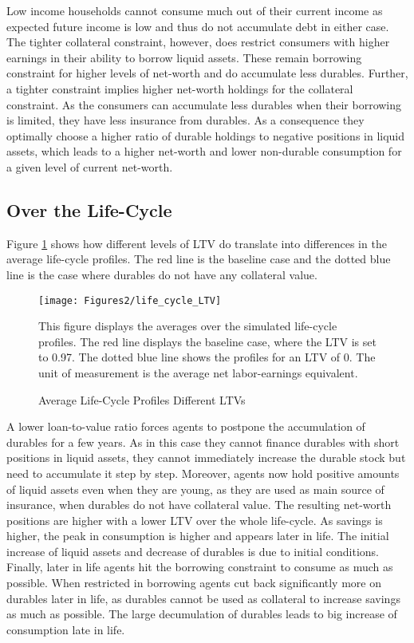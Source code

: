 \documentclass[a4paper,12pt,legno]{article}
\begin{document}
Low income households cannot consume much out of their current income as expected future income is low and thus do not accumulate debt in either case. The tighter collateral constraint, however, does restrict consumers with higher earnings in their ability to borrow liquid assets. These remain borrowing constraint for higher levels of net-worth and do accumulate less durables. Further, a tighter constraint implies higher net-worth holdings for the collateral constraint. As the consumers can accumulate less durables when their borrowing is limited, they have less insurance from durables. As a consequence they optimally choose a higher ratio of durable holdings to negative positions in liquid assets, which leads to a higher net-worth and lower non-durable consumption for a given level of current net-worth.

\subsection{Over the Life-Cycle}
Figure \ref{downpayment_vs_baseline_lc} shows how different levels of LTV do translate into differences in the average life-cycle profiles. The red line is the baseline case and the dotted blue line is the case where durables do not have any collateral value. \begin{figure}[!htbp]
\caption{Average Life-Cycle Profiles Different LTVs} 
\label{downpayment_vs_baseline_lc}	%
\centering
\texttt{[image: Figures2/life\_cycle\_LTV]}  %

\begin{minipage}{0.8\linewidth}
\footnotesize{This figure displays the averages over the simulated life-cycle profiles. The red line displays the baseline case, where the LTV is set to 0.97. The dotted blue line shows the profiles for an LTV of 0. The unit of measurement is the average net labor-earnings equivalent.}
\end{minipage}

\end{figure}A lower loan-to-value ratio forces agents to  postpone the accumulation of durables for a few years. As in this case they cannot finance durables with short positions in liquid assets, they cannot immediately increase the durable stock but need to accumulate it step by step. Moreover, agents now hold positive amounts of liquid assets even when they are young, as they are used as main source of insurance, when durables do not have collateral value. The resulting net-worth positions are higher with a lower LTV over the whole life-cycle. As savings is higher, the peak in consumption is higher and appears later in life.
The initial increase of liquid assets and decrease of durables is due to initial conditions. Finally, later in life agents hit the borrowing constraint to consume as much as possible. When restricted in borrowing agents cut back significantly more on durables later in life, as durables cannot be used as collateral to increase savings as much as possible. The large decumulation of durables leads to big increase of consumption late in life. 
\end{document}
